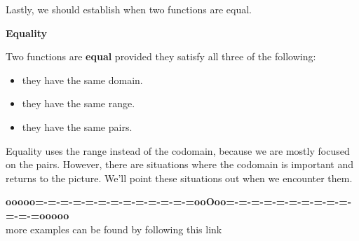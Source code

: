 \documentclass{ximera}
\begin{document}
Lastly, we should establish when two functions are equal. \\





\begin{definition} \textbf{\textcolor{green!50!black}{Equality}}

Two functions are \textbf{equal} provided they satisfy all three of the following:

\begin{itemize}
\item they have the same domain.
\item they have the same range.
\item they have the same pairs.
\end{itemize}

\end{definition}
Equality uses the range instead of the codomain, because we are mostly focused on the pairs.  However, there are situations where the codomain is important and returns to the picture.  We'll point these situations out when we encounter them.












\begin{center}
\textbf{\textcolor{green!50!black}{ooooo=-=-=-=-=-=-=-=-=-=-=-=-=ooOoo=-=-=-=-=-=-=-=-=-=-=-=-=ooooo}} \\

more examples can be found by following this link\\ 

\end{center}
\end{document}
